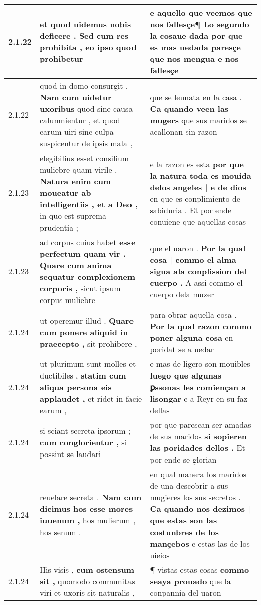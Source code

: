 \begin{tabular}{|p{1cm}|p{6.5cm}|p{6.5cm}|}
2.1.22 & et quod uidemus nobis deficere . \textbf{ Sed cum res prohibita , } eo ipso quod prohibetur & e aquello que veemos que nos fallesçe¶ Lo segundo la \textbf{ cosaue dada por que es mas uedada paresçe } que nos mengua e nos fallesçe \\\hline
2.1.22 & quod in domo consurgit . \textbf{ Nam cum uidetur uxoribus } quod sine causa calumnientur , et quod earum uiri sine culpa suspicentur de ipsis mala , & que se leunata en la casa . \textbf{ Ca quando veen las mugers } que sus maridos se acallonan sin razon \\\hline
2.1.23 & elegibilius esset consilium muliebre quam virile . \textbf{ Natura enim cum moueatur ab intelligentiis , et a Deo , } in quo est suprema prudentia ; & e la razon es esta \textbf{ por que la natura toda es mouida delos angeles | e de dios } en que es conplimiento de sabiduria . Et por ende conuiene que aquellas cosas \\\hline
2.1.23 & ad corpus cuius habet \textbf{ esse perfectum quam vir . Quare cum anima sequatur complexionem corporis , } sicut ipsum corpus muliebre & que el uaron . \textbf{ Por la qual cosa | commo el alma sigua ala conplission del cuerpo . } A assi commo el cuerpo dela muzer \\\hline
2.1.24 & ut operemur illud . \textbf{ Quare cum ponere aliquid in praecepto , } sit prohibere , & para obrar aquella cosa . \textbf{ Por la qual razon commo poner alguna cosa } en poridat se a uedar \\\hline
2.1.24 & ut plurimum sunt molles et ductibiles , \textbf{ statim cum aliqua persona eis applaudet , } et ridet in facie earum , & e mas de ligero son mouibles \textbf{ luego que algunas ꝑssonas les comiençan a lisongar } e a Reyr en su faz dellas \\\hline
2.1.24 & si sciant secreta ipsorum ; \textbf{ cum conglorientur , } si possint se laudari & por que parescan ser amadas de sus maridos \textbf{ si sopieren las poridades dellos . } Et por ende se glorian \\\hline
2.1.24 & reuelare secreta . \textbf{ Nam cum dicimus hos esse mores iuuenum , } hos mulierum , hos senum . & en qual manera los maridos de una descobrir a sus mugieres los sus secretos . \textbf{ Ca quando nos dezimos | que estas son las costunbres de los mançebos } e estas las de los uieios \\\hline
2.1.24 & His visis , \textbf{ cum ostensum sit , } quomodo communitas viri et uxoris sit naturalis , & ¶ vistas estas cosas \textbf{ commo seaya prouado } que la conpannia del uaron \\\hline

\end{tabular}
